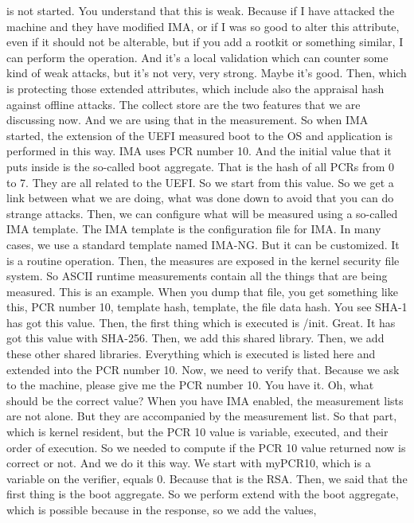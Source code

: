  is not started. You understand that this is weak. Because if I have attacked
 the machine and they have modified IMA, or if I was so good to alter this
 attribute, even if it should not be alterable, but if you add a rootkit or
 something similar, I can perform the operation. And it's a local validation
 which can counter some kind of weak attacks, but it's not very, very strong.
 Maybe it's good. Then, which is protecting those extended attributes, which
 include also the appraisal hash against offline attacks. The collect store are
 the two features that we are discussing now. And we are using that in the
 measurement. So when IMA started, the extension of the UEFI measured boot to
 the OS and application is performed in this way. IMA uses PCR number 10. And
 the initial value that it puts inside is the so-called boot aggregate. That is
 the hash of all PCRs from 0 to 7. They are all related to the UEFI. So we
 start from this value. So we get a link between what we are doing, what was
 done down to avoid that you can do strange attacks. Then, we can configure
 what will be measured using a so-called IMA template. The IMA template is the
 configuration file for IMA. In many cases, we use a standard template named
 IMA-NG. But it can be customized. It is a routine operation. Then, the
 measures are exposed in the kernel security file system. So ASCII runtime
 measurements contain all the things that are being measured. This is an
 example. When you dump that file, you get something like this, PCR number 10,
 template hash, template, the file data hash. You see SHA-1 has got this value.
 Then, the first thing which is executed is /init. Great. It has got this value
 with SHA-256. Then, we add this shared library. Then, we add these other
 shared libraries. Everything which is executed is listed here and extended
 into the PCR number 10. Now, we need to verify that. Because we ask to the
 machine, please give me the PCR number 10. You have it. Oh, what should be the
 correct value? When you have IMA enabled, the measurement lists are not alone.
 But they are accompanied by the measurement list. So that part, which is
 kernel resident, but the PCR 10 value is variable, executed, and their order
 of execution. So we needed to compute if the PCR 10 value returned now is
 correct or not. And we do it this way. We start with myPCR10, which is a
 variable on the verifier, equals 0. Because that is the RSA. Then, we said
 that the first thing is the boot aggregate. So we perform extend with the boot
 aggregate, which is possible because in the response, so we add the values,
